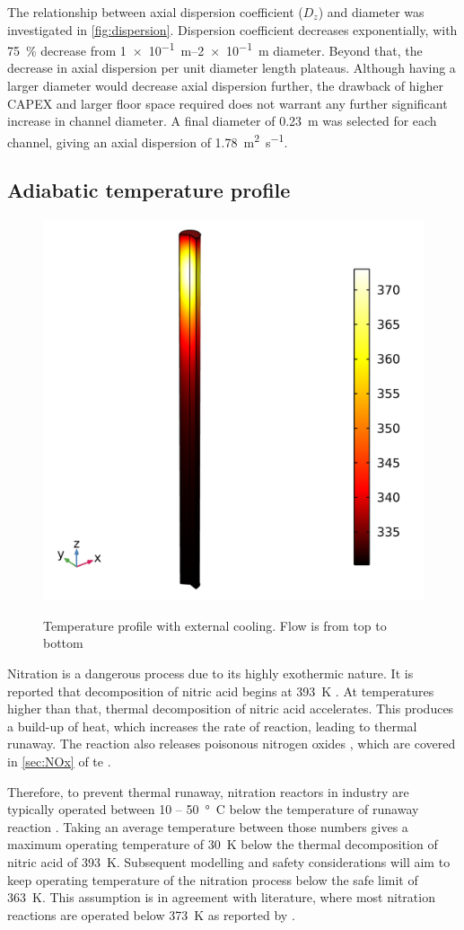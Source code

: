 The relationship between axial dispersion coefficient ($D_z$) and diameter was investigated in \cref{fig:dispersion}. Dispersion coefficient decreases exponentially, with \SI{75}{\%} decrease from \SIrange{1e-1}{2e-1}{\m} diameter. Beyond that, the decrease in axial dispersion per unit diameter length plateaus. Although having a larger diameter would decrease axial dispersion further, the drawback of higher CAPEX and larger floor space required does not warrant any further significant increase in channel diameter. A final diameter of \SI{0.23}{\metre} was selected for each channel, giving an axial dispersion of \SI{1.78}{\metre \squared \per \second}. 

\subsection{Adiabatic temperature profile}
\label{sec:adiabatic}

\begin{figure}
    \vspace{-\intextsep}
    \includegraphics[width=0.3\linewidth]{figures/simple-tube-temperature.png}
    \label{fig:Adiabatic-with-cooling}
    \caption{Temperature profile with external cooling. Flow is from top to bottom}
\end{figure} 
Nitration is a dangerous process due to its highly exothermic nature. It is reported that decomposition of nitric acid begins at \SI{393}{\K} \cite{di_miceli_raimondi_safety_2015}. At temperatures higher than that, thermal decomposition of nitric acid accelerates. This produces a build-up of heat, which increases the rate of reaction, leading to thermal runaway. The reaction also releases poisonous nitrogen oxides , which are covered in \cref{sec:NOx} of te . 

Therefore, to prevent thermal runaway, nitration reactors in industry are typically operated between \si{10} – \SI{50}{°C} below the temperature of runaway reaction \cite{noauthor_lees_2012}. Taking an average temperature between those numbers gives a maximum operating temperature of \SI{30}{\K} below the thermal decomposition of nitric acid of \SI{393}{\K}. Subsequent modelling and safety considerations will aim to keep operating temperature of the nitration process below the safe limit of \SI{363}{\K}. This assumption is in agreement with literature, where most nitration reactions are operated below \SI{373}{\K} as reported by \textcite{chen_experimental_1998}.


